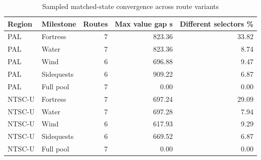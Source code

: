 \documentclass[11pt]{article}
\theoremstyle{definition}\newtheorem{definition}[theorem]{Definition}
\begin{document}
\begin{table}[H]\centering\small
\begin{tabular}{llrrr}\toprule
Region & Milestone & Routes & Max value gap s & Different selectors \%\\\midrule
PAL & Fortress & 7 & 823.36 & 33.82\\
PAL & Water & 7 & 823.36 & 8.74\\
PAL & Wind & 6 & 696.88 & 9.47\\
PAL & Sidequests & 6 & 909.22 & 6.87\\
PAL & Full pool & 7 & 0.00 & 0.00\\
NTSC-U & Fortress & 7 & 697.24 & 29.09\\
NTSC-U & Water & 7 & 697.28 & 7.94\\
NTSC-U & Wind & 6 & 617.93 & 9.29\\
NTSC-U & Sidequests & 6 & 669.52 & 6.87\\
NTSC-U & Full pool & 7 & 0.00 & 0.00\\
\bottomrule\end{tabular}
\caption{Sampled matched-state convergence across route variants}\label{tab:result-10}\end{table}
\end{document}
